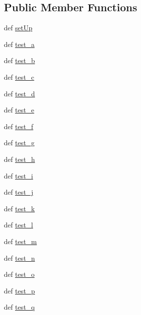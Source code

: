 \subsection*{Public Member Functions}
\begin{DoxyCompactItemize}
\item 
def \hyperlink{class__cookbook_1_1my__pyunit_1_1MyPyUnitTest_add8dae62bfa75940c16e29fe9e747ecf}{set\-Up}
\item 
def \hyperlink{class__cookbook_1_1my__pyunit_1_1MyPyUnitTest_a890394ba6f3a2be8fe549c77b48da1eb}{test\-\_\-a}
\item 
def \hyperlink{class__cookbook_1_1my__pyunit_1_1MyPyUnitTest_a782ad061affa65cc89b21fd95dc2d5d3}{test\-\_\-b}
\item 
def \hyperlink{class__cookbook_1_1my__pyunit_1_1MyPyUnitTest_a2cb2670508498a9de67fc530e752e3e4}{test\-\_\-c}
\item 
def \hyperlink{class__cookbook_1_1my__pyunit_1_1MyPyUnitTest_ab94bffe052b68b226914ef239b1658cb}{test\-\_\-d}
\item 
def \hyperlink{class__cookbook_1_1my__pyunit_1_1MyPyUnitTest_ae13b7160c2d4256fffe2b0846fbae5fc}{test\-\_\-e}
\item 
def \hyperlink{class__cookbook_1_1my__pyunit_1_1MyPyUnitTest_abdb32ee5c2e0a7fe9270c15f342046d0}{test\-\_\-f}
\item 
def \hyperlink{class__cookbook_1_1my__pyunit_1_1MyPyUnitTest_a350b8aa615b1ecb52ffceb3903a59f95}{test\-\_\-g}
\item 
def \hyperlink{class__cookbook_1_1my__pyunit_1_1MyPyUnitTest_ac72898ca445c2acee9cd93617ad38c5d}{test\-\_\-h}
\item 
def \hyperlink{class__cookbook_1_1my__pyunit_1_1MyPyUnitTest_ac619cd6aad71de2c754f72e62eb406f8}{test\-\_\-i}
\item 
def \hyperlink{class__cookbook_1_1my__pyunit_1_1MyPyUnitTest_a6f4660c020fbc79e44dc8937d9fc0cda}{test\-\_\-j}
\item 
def \hyperlink{class__cookbook_1_1my__pyunit_1_1MyPyUnitTest_a89c469ab6224a23625b9715b3f8abc0c}{test\-\_\-k}
\item 
def \hyperlink{class__cookbook_1_1my__pyunit_1_1MyPyUnitTest_a9dd83fe6d0e075ff1603828e076b5304}{test\-\_\-l}
\item 
def \hyperlink{class__cookbook_1_1my__pyunit_1_1MyPyUnitTest_a40bc1a1908b38c6656b6ad661b3ef0f9}{test\-\_\-m}
\item 
def \hyperlink{class__cookbook_1_1my__pyunit_1_1MyPyUnitTest_a3a1ef8a651622248b0b151ca0002e58d}{test\-\_\-n}
\item 
def \hyperlink{class__cookbook_1_1my__pyunit_1_1MyPyUnitTest_adb3aaee1a918b937ae6d40f3cb409951}{test\-\_\-o}
\item 
def \hyperlink{class__cookbook_1_1my__pyunit_1_1MyPyUnitTest_a6e1c88bb54ae00446aab3fb251920a3b}{test\-\_\-p}
\item 
def \hyperlink{class__cookbook_1_1my__pyunit_1_1MyPyUnitTest_a5d33a9a08e5c80403dc4e3762b4d198d}{test\-\_\-q}
\end{DoxyCompactItemize}
